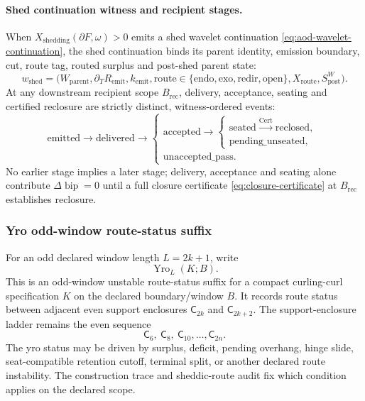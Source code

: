 \paragraph{Shed continuation witness and recipient stages.}
When \(X_{\mathrm{shedding}}(\partial F,\omega)>0\) emits a shed wavelet continuation
\eqref{eq:aod-wavelet-continuation}, the shed continuation binds its parent identity,
emission boundary, cut, route tag, routed surplus and post-shed parent state:
\begin{equation}
w_{\mathrm{shed}}
=
\bigl(W_{\mathrm{parent}},\partial_T R_{\mathrm{emit}},k_{\mathrm{emit}},
\mathrm{route}\in\{\mathrm{endo},\mathrm{exo},\mathrm{redir},\mathrm{open}\},
X_{\mathrm{route}},S^W_{\mathrm{post}}\bigr).
\label{eq:shed-continuation-witness}
\end{equation}
At any downstream recipient scope \(B_{\mathrm{rec}}\), delivery, acceptance,
seating and certified reclosure are strictly distinct, witness-ordered events:
\begin{equation}
\mathrm{emitted}\longrightarrow\mathrm{delivered}
\longrightarrow
\begin{cases}
\mathrm{accepted}\longrightarrow
\begin{cases}
\mathrm{seated}\xrightarrow{\operatorname{Cert}}\mathrm{reclosed},\\
\mathrm{pending\_unseated},
\end{cases}\\
\mathrm{unaccepted\_pass}.
\end{cases}
\label{eq:recipient-event-lattice}
\end{equation}
No earlier stage implies a later stage; delivery, acceptance and seating alone
contribute \(\Delta\operatorname{bip}=0\) until a full closure certificate
\eqref{eq:closure-certificate} at \(B_{\mathrm{rec}}\) establishes reclosure.


\subsubsection{Yro odd-window route-status suffix}\label{subsec:yro-odd-window-route-status}
For an odd declared window length \(L=2k+1\), write
\[
\operatorname{Yro}_{L}(K;B).
\]
This is an odd-window unstable route-status suffix for a compact curling-curl specification \(K\) on the declared boundary/window \(B\). It records route status between adjacent even support enclosures \(\mathsf C_{2k}\) and \(\mathsf C_{2k+2}\). The support-enclosure ladder remains the even sequence
\[
\mathsf C_6,\ \mathsf C_8,\ \mathsf C_{10},\ldots,\mathsf C_{2n}.
\]
The yro status may be driven by surplus, deficit, pending overhang, hinge slide, seat-compatible retention cutoff, terminal split, or another declared route instability. The construction trace and sheddic-route audit fix which condition applies on the declared scope.

